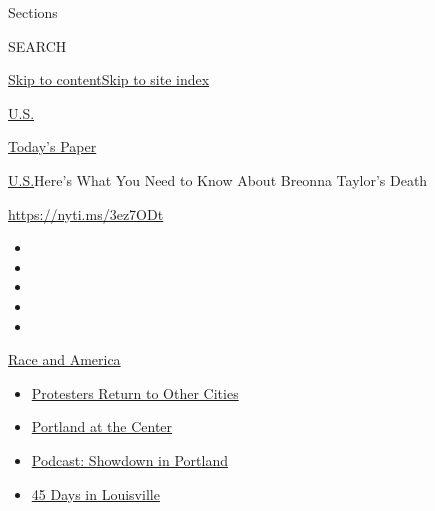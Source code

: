 Sections

SEARCH

\protect\hyperlink{site-content}{Skip to
content}\protect\hyperlink{site-index}{Skip to site index}

\href{https://www.nytimes3xbfgragh.onion/section/us}{U.S.}

\href{https://myaccount.nytimes3xbfgragh.onion/auth/login?response_type=cookie\&client_id=vi}{}

\href{https://www.nytimes3xbfgragh.onion/section/todayspaper}{Today's
Paper}

\href{/section/us}{U.S.}\textbar{}Here's What You Need to Know About
Breonna Taylor's Death

\url{https://nyti.ms/3ez7ODt}

\begin{itemize}
\item
\item
\item
\item
\item
\end{itemize}

\href{https://www.nytimes3xbfgragh.onion/news-event/george-floyd-protests-minneapolis-new-york-los-angeles?action=click\&pgtype=Article\&state=default\&region=TOP_BANNER\&context=storylines_menu}{Race
and America}

\begin{itemize}
\tightlist
\item
  \href{https://www.nytimes3xbfgragh.onion/2020/07/26/us/protests-portland-seattle-trump.html?action=click\&pgtype=Article\&state=default\&region=TOP_BANNER\&context=storylines_menu}{Protesters
  Return to Other Cities}
\item
  \href{https://www.nytimes3xbfgragh.onion/2020/07/24/us/portland-oregon-protests-white-race.html?action=click\&pgtype=Article\&state=default\&region=TOP_BANNER\&context=storylines_menu}{Portland
  at the Center}
\item
  \href{https://www.nytimes3xbfgragh.onion/2020/07/23/podcasts/the-daily/portland-protests.html?action=click\&pgtype=Article\&state=default\&region=TOP_BANNER\&context=storylines_menu}{Podcast:
  Showdown in Portland}
\item
  \href{https://www.nytimes3xbfgragh.onion/interactive/2020/07/16/us/black-lives-matter-protests-louisville-breonna-taylor.html?action=click\&pgtype=Article\&state=default\&region=TOP_BANNER\&context=storylines_menu}{45
  Days in Louisville}
\end{itemize}

